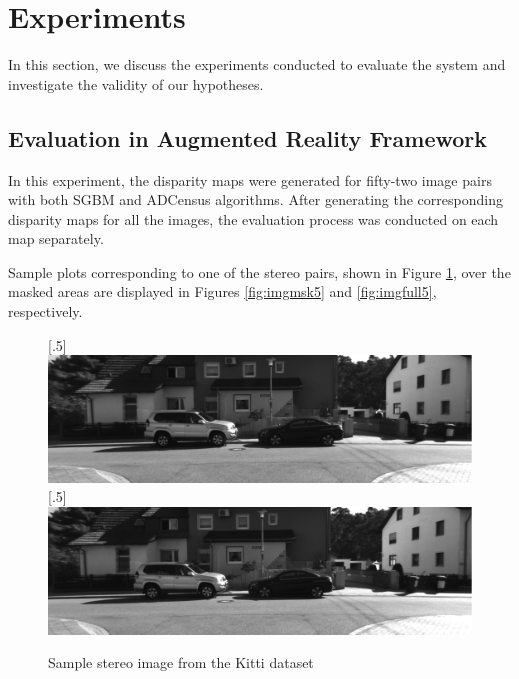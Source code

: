 
\section{Experiments}
In this section, we discuss the experiments conducted to evaluate the system and investigate the validity of our hypotheses.

\subsection{Evaluation in Augmented Reality Framework}

In this experiment, the disparity maps 
were generated for fifty-two image pairs with both SGBM and ADCensus algorithms. 
After generating the corresponding disparity maps for all the images, 
the evaluation process was conducted on each map separately.

Sample plots corresponding to one of the stereo pairs, shown in Figure \ref{fig:img5},
over the masked areas are displayed in Figures \ref{fig:imgmsk5} and \ref{fig:imgfull5}, respectively.

\begin{figure}[h!]
\centering
{}
[.5\linewidth]{\includegraphics[scale=0.21]{000005L}}%
[.5\linewidth]{\includegraphics[scale=0.21]{000005R}}%
\caption{Sample stereo image from the Kitti dataset}
\label{fig:img5}
\end{figure}

